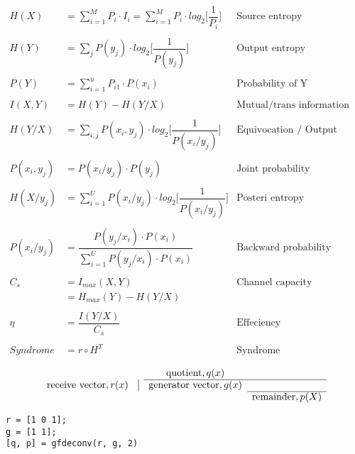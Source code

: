 \documentclass[Main]{subfiles}
\begin{document}
\begin{align*}
H(X) &= \sum_{i=1}^M P_i\cdot I_i = \sum_{i=1}^M P_i\cdot log_2\bigg[\dfrac{1}{P_i}\bigg] & \text{Source entropy}
\\
\\
H(Y) &= \sum_j P(y_j)\cdot log_2 \bigg[\dfrac{1}{P(y_j)}\bigg] &\text{Output entropy}
\\
\\
P(Y) &= \sum_{i=1}^u P_{i1} \cdot P(x_i) &\text{Probability of Y}
\\
\\
I(X,Y) &= H(Y) - H(Y/X) &\text{Mutual/trans information}
\\
\\
H(Y/X) &= \sum_{i,j} P(x_i, y_j) \cdot log_2\bigg[\dfrac{1}{P(x_i/y_j)}\bigg] & \text{Equivocation / Output channel entropy}
\\
\\
P(x_i, y_j) &= P(x_i/y_j) \cdot P(y_j) & \text{Joint probability}
\\
\\
H(X/y_j) &= \sum_{i=1}^U P(x_i/y_j)\cdot log_2 \bigg[\dfrac{1}{P(x_i/y_j)}\bigg] & \text{Posteri entropy}
\\
\\
P(x_i/y_j) &= \dfrac{P(y_j/x_i)\cdot P(x_i)}{\sum_{i=1}^U P(y_j/x_i)\cdot P(x_i)} & \text{Backward probability}
\\
\\
C_s &= I_{max}(X,Y) & \text{Channel capacity}\\
	&= H_{max}(Y) - H(Y/X)
\\
\\
\eta &= \dfrac{I(Y/X)}{C_s}	& \text{Effeciency}
\\
\\
Syndrome &= r \circ H^T & \text{Syndrome}
\end{align*}


\[
\begin{array}{cccccccccccccccccc}
&& \text{quotient}, q(x)  &\\
\cline{3-4}
\text{receive vector}, r(x) &\vline & \text{generator vector}, g(x)  \\
\cline{4-4}
& & & \text{remainder}, p(X)
\end{array}
\]


\begin{lstlisting}[caption=Polynomial division, style=Code-Matlab, label=lst:PolDiv]
r = [1 0 1];
g = [1 1];
[q, p] = gfdeconv(r, g, 2)
\end{lstlisting}
\end{document}
